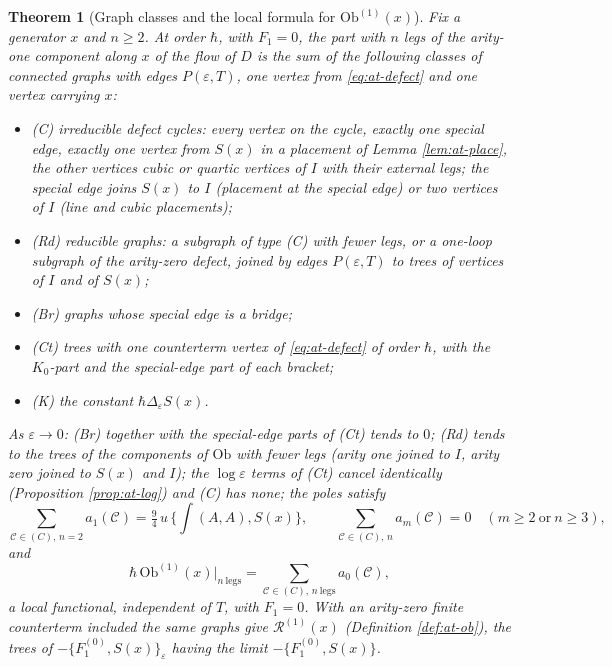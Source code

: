 \documentclass[11pt]{article}
\numberwithin{equation}{section}
\theoremstyle{plain}
\newtheorem{theorem}{Theorem}[section]
\theoremstyle{definition}
\newcommand{\Ob}{\mathrm{Ob}}
\begin{document}
\begin{theorem}[Graph classes and the local formula for $\Ob^{(1)}(x)$]
\label{thm:at-classes}
Fix a generator $x$ and $n\ge2$. At order $\hbar$, with $F_1=0$, the part with $n$ legs of the arity-one component along $x$ of the flow of $D$ is the sum of the following classes of connected graphs with edges $P(\varepsilon,T)$, one vertex from \eqref{eq:at-defect} and one vertex carrying $x$:
\begin{itemize}
\item (C) irreducible defect cycles: every vertex on the cycle, exactly one special edge, exactly one vertex from $S(x)$ in a placement of Lemma \ref{lem:at-place}, the other vertices cubic or quartic vertices of $I$ with their external legs; the special edge joins $S(x)$ to $I$ (placement at the special edge) or two vertices of $I$ (line and cubic placements);
\item (Rd) reducible graphs: a subgraph of type (C) with fewer legs, or a one-loop subgraph of the arity-zero defect, joined by edges $P(\varepsilon,T)$ to trees of vertices of $I$ and of $S(x)$;
\item (Br) graphs whose special edge is a bridge;
\item (Ct) trees with one counterterm vertex of \eqref{eq:at-defect} of order $\hbar$, with the $K_0$-part and the special-edge part of each bracket;
\item (K) the constant $\hbar\Delta_\varepsilon S(x)$.
\end{itemize}
As $\varepsilon\to0$: (Br) together with the special-edge parts of (Ct) tends to $0$; (Rd) tends to the trees of the components of $\Ob$ with fewer legs (arity one joined to $I$, arity zero joined to $S(x)$ and $I$); the $\log\varepsilon$ terms of (Ct) cancel identically (Proposition \ref{prop:at-log}) and (C) has none; the poles satisfy
\begin{equation}
\sum_{\mathcal C\in(C),\,n=2}a_1(\mathcal C)=\tfrac94\,u\,\Big\{\int(A,A),S(x)\Big\},\qquad \sum_{\mathcal C\in(C),\,n}a_m(\mathcal C)=0\quad(m\ge2\ \text{or}\ n\ge3),
\label{eq:at-pole}
\end{equation}
and
\begin{equation}
\hbar\,\Ob^{(1)}(x)\big|_{n\ \text{legs}}=\sum_{\mathcal C\in(C),\,n\ \text{legs}}a_0(\mathcal C),
\label{eq:at-localformula}
\end{equation}
a local functional, independent of $T$, with $F_1=0$. With an arity-zero finite counterterm included the same graphs give $\mathcal R^{(1)}(x)$ (Definition \ref{def:at-ob}), the trees of $-\{F_1^{(0)},S(x)\}_\varepsilon$ having the limit $-\{F_1^{(0)},S(x)\}$.
\end{theorem}
\end{document}
